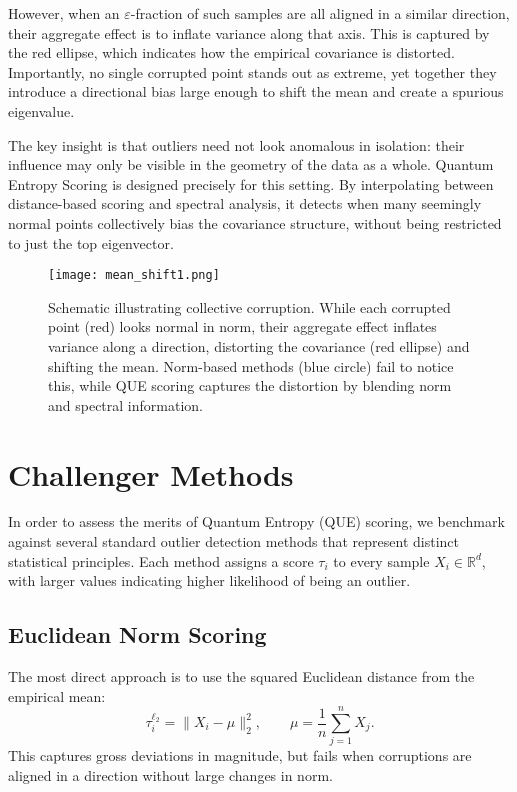 \documentclass[11pt]{article}
\begin{document}
However, when an $\varepsilon$-fraction of such samples are all aligned in a similar direction, their aggregate effect is to inflate variance along that axis. This is captured by the red ellipse, which indicates how the empirical covariance is distorted. Importantly, no single corrupted point stands out as extreme, yet together they introduce a directional bias large enough to shift the mean and create a spurious eigenvalue.

The key insight is that outliers need not look anomalous in isolation: their influence may only be visible in the geometry of the data as a whole. Quantum Entropy Scoring is designed precisely for this setting. By interpolating between distance-based scoring and spectral analysis, it detects when many seemingly normal points collectively bias the covariance structure, without being restricted to just the top eigenvector.

\begin{figure}[h!]
    \centering
    \texttt{[image: mean\_shift1.png]}
    \caption{Schematic illustrating collective corruption. While each corrupted point (red) looks normal in norm, their aggregate effect inflates variance along a direction, distorting the covariance (red ellipse) and shifting the mean. Norm-based methods (blue circle) fail to notice this, while QUE scoring captures the distortion by blending norm and spectral information.}
    \label{fig:que-example}
\end{figure}

\section{Challenger Methods}
In order to assess the merits of Quantum Entropy (QUE) scoring, we benchmark against several standard
outlier detection methods that represent distinct statistical principles. Each method assigns a score
$\tau_i$ to every sample $X_i \in \mathbb{R}^d$, with larger values indicating higher likelihood of being
an outlier.

\subsection{Euclidean Norm Scoring}
The most direct approach is to use the squared Euclidean distance from the empirical mean:
\[
\tau_i^{\ell_2} = \|X_i - \mu\|_2^2,
\qquad \mu = \frac{1}{n}\sum_{j=1}^n X_j.
\]
This captures gross deviations in magnitude, but fails when corruptions are aligned in a direction without
large changes in norm.
\end{document}
